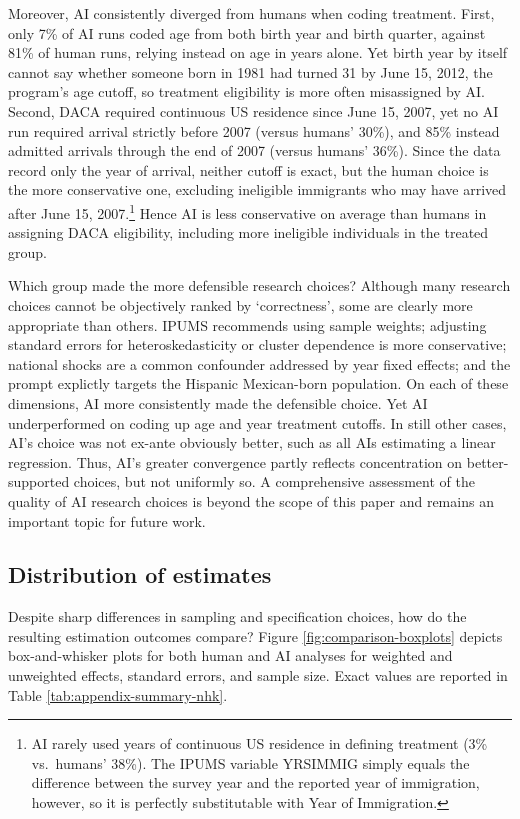 \documentclass[
  12pt]{article}
\begin{document}
Moreover, AI consistently diverged from humans when coding treatment.
First, only 7\% of AI runs coded age from both birth year and birth
quarter, against 81\% of human runs, relying instead on age in years
alone. Yet birth year by itself cannot say whether someone born in 1981
had turned 31 by June 15, 2012, the program's age cutoff, so treatment
eligibility is more often misassigned by AI. Second, DACA required
continuous US residence since June 15, 2007, yet no AI run required
arrival strictly before 2007 (versus humans' 30\%), and 85\% instead
admitted arrivals through the end of 2007 (versus humans' 36\%). Since
the data record only the year of arrival, neither cutoff is exact, but
the human choice is the more conservative one, excluding ineligible
immigrants who may have arrived after June 15, 2007.\footnote{AI rarely
  used years of continuous US residence in defining treatment (3\%
  vs.~humans' 38\%). The IPUMS variable YRSIMMIG simply equals the
  difference between the survey year and the reported year of
  immigration, however, so it is perfectly substitutable with Year of
  Immigration.} Hence AI is less conservative on average than humans in
assigning DACA eligibility, including more ineligible individuals in the
treated group.

Which group made the more defensible research choices? Although many
research choices cannot be objectively ranked by `correctness', some are
clearly more appropriate than others. IPUMS recommends using sample
weights; adjusting standard errors for heteroskedasticity or cluster
dependence is more conservative; national shocks are a common confounder
addressed by year fixed effects; and the prompt explictly targets the
Hispanic Mexican-born population. On each of these dimensions, AI more
consistently made the defensible choice. Yet AI underperformed on coding
up age and year treatment cutoffs. In still other cases, AI's choice was
not ex-ante obviously better, such as all AIs estimating a linear
regression. Thus, AI's greater convergence partly reflects concentration
on better-supported choices, but not uniformly so. A comprehensive
assessment of the quality of AI research choices is beyond the scope of
this paper and remains an important topic for future work.

\subsection{Distribution of estimates}\label{distribution-of-estimates}

Despite sharp differences in sampling and specification choices, how do
the resulting estimation outcomes compare? Figure
\ref{fig:comparison-boxplots} depicts box-and-whisker plots for both
human and AI analyses for weighted and unweighted effects, standard
errors, and sample size. Exact values are reported in Table
\ref{tab:appendix-summary-nhk}.
\end{document}
